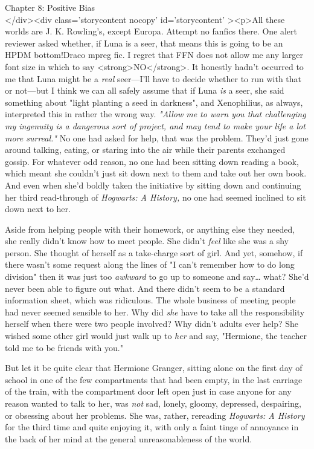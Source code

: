 
Chapter 8: Positive Bias\\
</div><div  class='storycontent nocopy' id='storycontent' ><p>All these worlds are J. K. Rowling's, except Europa. Attempt no fanfics there.
\sbreak
One alert reviewer asked whether, if Luna is a seer, that means this is going to be an HPDM bottom!Draco mpreg fic. I regret that FFN does not allow me any larger font size in which to say <strong>NO</strong>. It honestly hadn't occurred to me that Luna might be a \emph{real} seer---I'll have to decide whether to run with that or not---but I think we can all safely assume that if Luna \emph{is} a seer, she said something about "light planting a seed in darkness", and Xenophilius, as always, interpreted this in rather the wrong way.
\sbreak
\emph{"Allow me to warn you that challenging my ingenuity is a dangerous sort of project, and may tend to make your life a lot more surreal."}
\sbreak
No one had asked for help, that was the problem. They'd just gone around talking, eating, or staring into the air while their parents exchanged gossip. For whatever odd reason, no one had been sitting down reading a book, which meant she couldn't just sit down next to them and take out her own book. And even when she'd boldly taken the initiative by sitting down and continuing her third read-through of \emph{Hogwarts: A History,} no one had seemed inclined to sit down next to her.

Aside from helping people with their homework, or anything else they needed, she really didn't know how to meet people. She didn't \emph{feel} like she was a shy person. She thought of herself as a take-charge sort of girl. And yet, somehow, if there wasn't some request along the lines of "I can't remember how to do long division" then it was just too \emph{awkward} to go up to someone and say{\ldots} what? She'd never been able to figure out what. And there didn't seem to be a standard information sheet, which was ridiculous. The whole business of meeting people had never seemed sensible to her. Why did \emph{she} have to take all the responsibility herself when there were two people involved? Why didn't adults ever help? She wished some other girl would just walk up to \emph{her} and say, "Hermione, the teacher told me to be friends with you."

But let it be quite clear that Hermione Granger, sitting alone on the first day of school in one of the few compartments that had been empty, in the last carriage of the train, with the compartment door left open just in case anyone for any reason wanted to talk to her, was \emph{not} sad, lonely, gloomy, depressed, despairing, or obsessing about her problems. She was, rather, rereading \emph{Hogwarts: A History} for the third time and quite enjoying it, with only a faint tinge of annoyance in the back of her mind at the general unreasonableness of the world.


